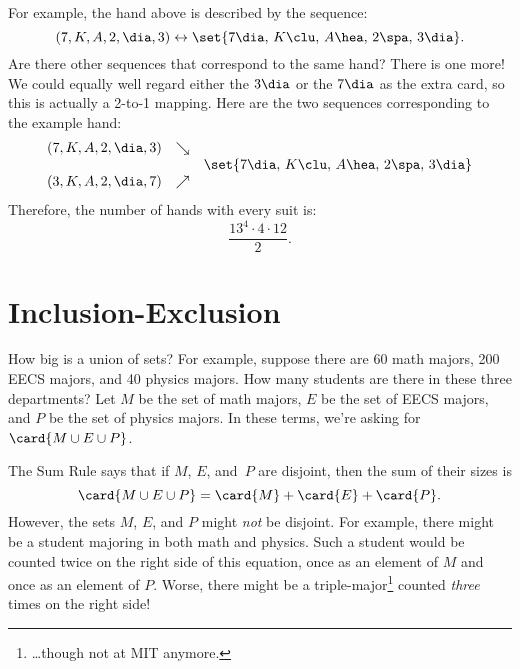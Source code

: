 For example, the hand above is described by the sequence:
%
\[
(7, K, A, 2, \dia, 3) \leftrightarrow 
    \set{ 7 \dia, \, K \clu, \, A \hea, \, 2 \spa, \, 3 \dia  }.
\]
%
Are there other sequences that correspond to the same hand?  There is
one more!  We could equally well regard either the $3 \dia$ or the $7
\dia$ as the extra card, so this is actually a 2-to-1 mapping.  Here
are the two sequences corresponding to the example hand:
%
\[
\begin{array}{rcl}
(7, K, A, 2, \dia, 3) & \searrow & \\
 && \set{ 7 \dia, \, K \clu, \, A \hea, \, 2 \spa, \, 3 \dia } \\
(3, K, A, 2, \dia, 7) & \nearrow &
\end{array}
\]
%
Therefore, the number of hands with every suit is:
%
\[
\frac{13^4 \cdot 4 \cdot 12}{2}.
\]

\begin{problems}
\classproblems
{}

\examproblems
{}

\end{problems}



\section{Inclusion-Exclusion}\label{inc-ex_sec}

How big is a union of sets?  For example, suppose there are 60 math
majors, 200 EECS majors, and 40 physics majors.  How many students are
there in these three departments?  Let $M$ be the set of math majors,
$E$ be the set of EECS majors, and $P$ be the set of physics majors.  In
these terms, we're asking for $\card{M \cup E \cup P}$.

The Sum Rule says that if $M$, $E$, and~$P$ are disjoint, then the sum
of their sizes is
%
\[
\card{M \cup E \cup P} = \card{M} + \card{E} + \card{P} .
\]
%
However, the sets $M$, $E$, and $P$ might \emph{not} be disjoint.  For
example, there might be a student majoring in both math and
physics.  Such a student would be counted twice on the right side of this
equation, once as an element of $M$ and once as an element of $P$.  Worse,
there might be a triple-major\footnote{\dots though not at MIT anymore.}
counted \emph{three} times on the right side!

